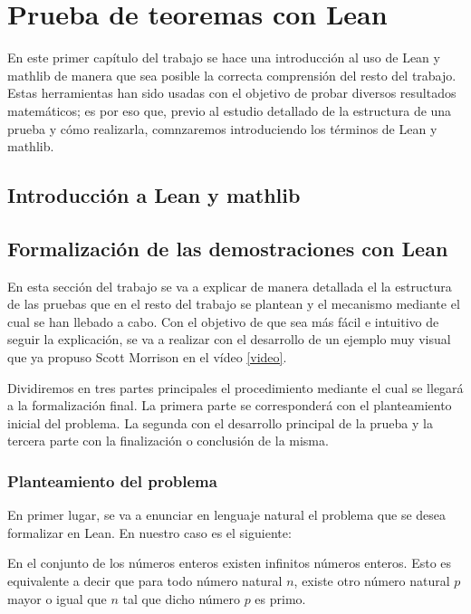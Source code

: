 \chapter{Prueba de teoremas con Lean}
En este primer capítulo del trabajo se hace una introducción al uso de Lean
y mathlib de manera que sea posible la correcta comprensión del resto del
trabajo. Estas herramientas han sido usadas con el objetivo de probar diversos
resultados matemáticos; es por eso que, previo al estudio detallado de la
estructura de una prueba y cómo realizarla, comnzaremos introduciendo los
términos de Lean y mathlib.

\section{Introducción a Lean y mathlib}



\section{Formalización de las demostraciones con Lean}
En esta sección del trabajo se va a explicar de manera detallada el la
estructura de las pruebas que en el resto del trabajo se plantean y el
mecanismo mediante el cual se han llebado a cabo. Con el objetivo de que sea
más fácil e intuitivo de seguir la explicación, se va a realizar con el
desarrollo de un ejemplo muy visual que ya propuso Scott Morrison en el
vídeo \ref{video}.

Dividiremos en tres partes principales el procedimiento mediante el cual
se llegará a la formalización final. La primera parte se corresponderá con el
planteamiento inicial del problema. La segunda con el desarrollo principal
de la prueba y la tercera parte con la finalización o conclusión de la misma.

\subsection{Planteamiento del problema}
En primer lugar, se va a enunciar en lenguaje natural el problema que se
desea formalizar en Lean. En nuestro caso es el siguiente:
\begin{teorema}\label{infi}
  En el conjunto de los números enteros existen infinitos números enteros.
  Esto es equivalente a decir que para todo número natural \(n\), existe
  otro número natural \(p\) mayor o igual que \(n\) tal que dicho número
  \(p\) es primo.
\end{teorema}

